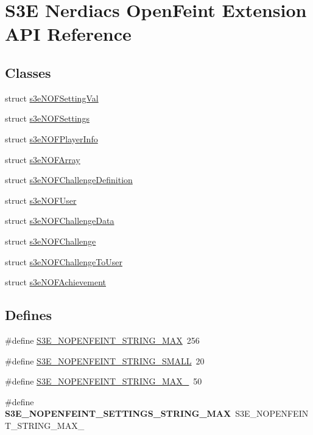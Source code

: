 \hypertarget{group___n_open_feint_api_group}{
\section{S3E Nerdiacs OpenFeint Extension API Reference}
\label{group___n_open_feint_api_group}
}
\subsection*{Classes}
\begin{DoxyCompactItemize}
\item 
struct \hyperlink{structs3e_n_o_f_setting_val}{s3eNOFSettingVal}
\item 
struct \hyperlink{structs3e_n_o_f_settings}{s3eNOFSettings}
\item 
struct \hyperlink{structs3e_n_o_f_player_info}{s3eNOFPlayerInfo}
\item 
struct \hyperlink{structs3e_n_o_f_array}{s3eNOFArray}
\item 
struct \hyperlink{structs3e_n_o_f_challenge_definition}{s3eNOFChallengeDefinition}
\item 
struct \hyperlink{structs3e_n_o_f_user}{s3eNOFUser}
\item 
struct \hyperlink{structs3e_n_o_f_challenge_data}{s3eNOFChallengeData}
\item 
struct \hyperlink{structs3e_n_o_f_challenge}{s3eNOFChallenge}
\item 
struct \hyperlink{structs3e_n_o_f_challenge_to_user}{s3eNOFChallengeToUser}
\item 
struct \hyperlink{structs3e_n_o_f_achievement}{s3eNOFAchievement}
\end{DoxyCompactItemize}
\subsection*{Defines}
\begin{DoxyCompactItemize}
\item 
\#define \hyperlink{group___n_open_feint_api_group_ga2a3a66951aa3d2b0cb2eaac82c1ff30c}{S3E\_\-NOPENFEINT\_\-STRING\_\-MAX}~256
\item 
\#define \hyperlink{group___n_open_feint_api_group_gafb2f974aafabe744d8384a8ff582cd56}{S3E\_\-NOPENFEINT\_\-STRING\_\-SMALL}~20
\item 
\#define \hyperlink{group___n_open_feint_api_group_ga714d35726c88b507a262d4164daf54d6}{S3E\_\-NOPENFEINT\_\-STRING\_\-MAX\_}~50
\item 
\hypertarget{group___n_open_feint_api_group_gaffdb94bdce260640c1db6cf3adfb5477}{
\#define {\bfseries S3E\_\-NOPENFEINT\_\-SETTINGS\_\-STRING\_\-MAX}~S3E\_\-NOPENFEINT\_\-STRING\_\-MAX\_}
\label{group___n_open_feint_api_group_gaffdb94bdce260640c1db6cf3adfb5477}

\end{DoxyCompactItemize}
